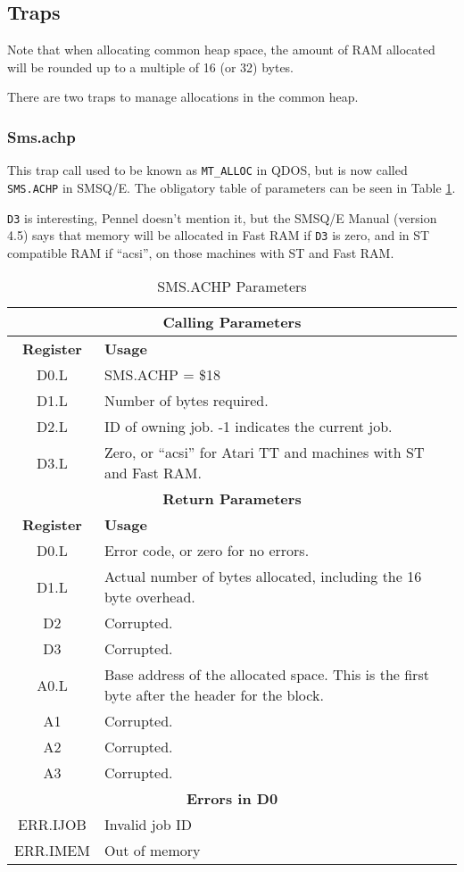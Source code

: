 \subsection{Traps}

Note that when allocating common heap space, the amount of RAM allocated
will be rounded up to a multiple of 16 (or 32) bytes. 

There are two traps to manage allocations in the common heap.

\subsubsection{Sms.achp}

This trap call used to be known as \texttt{MT\_ALLOC} in QDOS, but
is now called \texttt{SMS.ACHP} in SMSQ/E. The obligatory table of
parameters can be seen in Table \ref{tab:SMS.ACHP-Parameters}.

\texttt{D3} is interesting, Pennel doesn't mention it, but the SMSQ/E
Manual (version 4.5) says that memory will be allocated in Fast RAM
if \texttt{D3} is zero, and in ST compatible RAM if ``acsi'', on
those machines with ST and Fast RAM.

\begin{table}[!h]
\begin{centering}
\begin{tabular}{|c|>{\raggedright}p{}|}
\hline 
\multicolumn{2}{|c|}{\textbf{Calling Parameters}}\tabularnewline
\hline 
\textbf{Register} & \textbf{Usage}\tabularnewline
\hline 
D0.L & SMS.ACHP = \$18\tabularnewline
\hline 
D1.L & Number of bytes required.\tabularnewline
\hline 
D2.L & ID of owning job. -1 indicates the current job.\tabularnewline
\hline 
D3.L & Zero, or ``acsi'' for Atari TT and machines with ST and Fast RAM. \tabularnewline
\hline 
\multicolumn{2}{|c|}{\textbf{Return Parameters}}\tabularnewline
\hline 
\textbf{Register} & \textbf{Usage}\tabularnewline
\hline 
D0.L & Error code, or zero for no errors.\tabularnewline
\hline 
D1.L & Actual number of bytes allocated, including the 16 byte overhead.\tabularnewline
\hline 
D2 & Corrupted.\tabularnewline
\hline 
D3 & Corrupted.\tabularnewline
\hline 
A0.L & Base address of the allocated space. This is the first byte after
the header for the block.\tabularnewline
\hline 
A1 & Corrupted.\tabularnewline
\hline 
A2 & Corrupted.\tabularnewline
\hline 
A3 & Corrupted.\tabularnewline
\hline 
\multicolumn{2}{|c|}{\textbf{Errors in D0}}\tabularnewline
\hline 
ERR.IJOB & Invalid job ID\tabularnewline
\hline 
ERR.IMEM & Out of memory\tabularnewline
\hline 
\end{tabular}
\par\end{centering}
\caption{SMS.ACHP Parameters\label{tab:SMS.ACHP-Parameters}}

\end{table}


